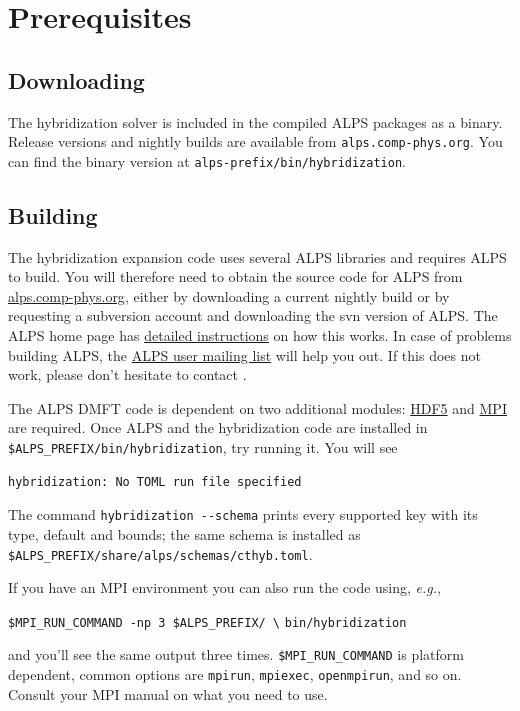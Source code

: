 \documentclass[aps,prb,floatfix,superscriptaddress,twocolumn,notitlepage]{revtex4-1}
\begin{document}
\section{Prerequisites}
\subsection{Downloading}
The hybridization solver is included in the compiled ALPS packages as a binary. Release versions and nightly builds are available from \verb#alps.comp-phys.org#. You can find the binary version at \verb#alps-prefix#\verb#/bin#\verb#/hybridization#.
\subsection{Building}
The hybridization expansion code uses several ALPS libraries\cite{ALPS20} and requires ALPS to build. You will therefore need to obtain the source code for ALPS from \href{http://alps.comp-phys.org}{alps.comp-phys.org}, either by downloading a current nightly build or by requesting a subversion account and downloading the svn version of ALPS. The ALPS home page has \href{http://alps.comp-phys.org/mediawiki/index.php/Download_and_install_ALPS_2}{detailed instructions} on how this works. In case of problems building ALPS, the \href{mailto:comp-phys-alps-users@lists.phys.ethz.ch}{ALPS user mailing list} will help you out. If this does not work, please don't hesitate to  contact \Emanuel.

The ALPS DMFT code is dependent on two additional modules: \href{http://www.hdfgroup.org/}{HDF5} and \href{http://www.openmpi.org}{MPI} are required.
Once ALPS and the hybridization code are installed in \verb#$ALPS_PREFIX/#\verb#bin/#\verb#hybridization#, try running it. You will see
\begin{verbatim}
hybridization: No TOML run file specified
\end{verbatim}
The command \verb#hybridization --schema# prints every supported key with its type, default and bounds; the same schema is installed as \verb#$ALPS_PREFIX/share/alps/schemas/cthyb.toml#.

If you have an MPI environment you can also run the code using, {\it e.g.},

\verb#$MPI_RUN_COMMAND -np 3 $ALPS_PREFIX/ \#
\verb#bin/hybridization#

and you'll see the same output three times. \verb#$MPI_RUN_COMMAND# is platform dependent, common options are \verb#mpirun#, \verb#mpiexec#, \verb#openmpirun#, and so on. Consult your MPI manual on what you need to use.
\end{document}
